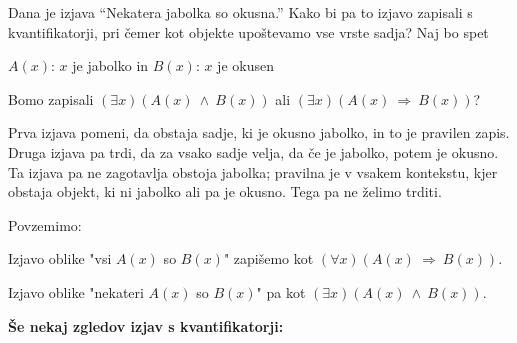 \documentclass[11pt,paper=b5,DIV=13,headinclude,footinclude]{scrbook}
\newcounter{example}
\def\inn {{~\wedge~}}
\def\sledi {{~\Rightarrow~}}
\begin{document}
\medskip
\begin{example*}
Dana je izjava ``Nekatera jabolka so okusna.'' Kako bi pa to izjavo zapisali s kvantifikatorji, pri čemer kot objekte upoštevamo vse vrste sadja?
Naj bo spet

$A(x)$: $x$ je jabolko
 in
$B(x)$: $x$ je okusen

Bomo zapisali $(\exists x)(A(x)\inn B(x))$ ali $(\exists x)(A(x) \sledi B(x))$?

Prva izjava pomeni, da obstaja sadje, ki je okusno jabolko, in to je pravilen zapis.
Druga izjava pa trdi, da za vsako sadje velja, da če je jabolko, potem je okusno. Ta izjava pa ne zagotavlja obstoja jabolka;
pravilna je v vsakem kontekstu, kjer obstaja objekt, ki ni jabolko ali pa je okusno. Tega pa ne želimo trditi.
\end{example*}

\medskip
Povzemimo:

{Izjavo oblike "vsi $A(x)$ so $B(x)$" zapišemo kot $(\forall x)(A(x)\sledi B(x))$.

Izjavo oblike "nekateri $A(x)$ so $B(x)$" pa kot $(\exists x)(A(x)\inn B(x))$.}

\medskip

\medskip
\noindent\textbf{ Še nekaj zgledov izjav s kvantifikatorji:}
\end{document}

